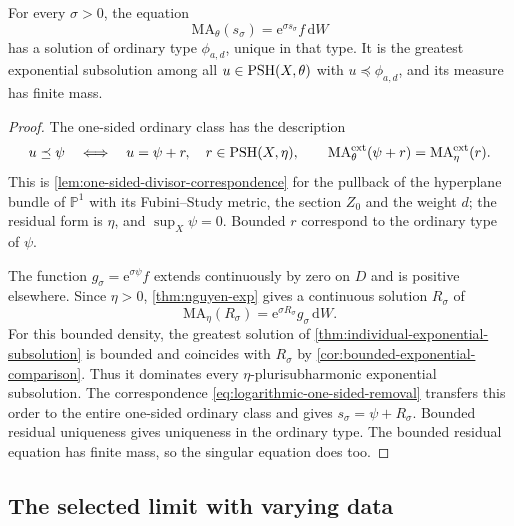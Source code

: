 \begin{lemma}\label{lem:logarithmic-greatest-solutions}
For every $\sigma>0$, the equation
\begin{equation}\label{eq:logarithmic-product-exponential}
 \mathrm{MA}_\theta(s_\sigma)=\mathrm{e}^{\sigma s_\sigma}f\,\mathrm{d}W
\end{equation}
has a solution of ordinary type $\phi_{a,d}$, unique in that type. It is the greatest exponential subsolution among all $u\in\mathrm{PSH}(X,\theta)$ with $u\preceq\phi_{a,d}$, and its measure has finite mass.
\end{lemma}
\begin{proof}
The one-sided ordinary class has the description
\begin{equation}\label{eq:logarithmic-one-sided-removal}
 u\preceq\psi\quad\Longleftrightarrow\quad
 u=\psi+r,\quad r\in\mathrm{PSH}(X,\eta),\qquad
 \mathrm{MA}^{\mathrm{ext}}_\theta(\psi+r)
       =\mathrm{MA}^{\mathrm{ext}}_\eta(r).
\end{equation}
This is \cref{lem:one-sided-divisor-correspondence} for the pullback of the hyperplane bundle of $\mathbb P^1$ with its Fubini--Study metric, the section $Z_0$ and the weight $d$; the residual form is $\eta$, and $\sup_X\psi=0$. Bounded $r$ correspond to the ordinary type of $\psi$.

The function $g_\sigma=\mathrm{e}^{\sigma\psi}f$ extends continuously by zero on $D$ and is positive elsewhere. Since $\eta>0$, \cref{thm:nguyen-exp} gives a continuous solution $R_\sigma$ of
\[
 \mathrm{MA}_\eta(R_\sigma)=\mathrm{e}^{\sigma R_\sigma}g_\sigma\,\mathrm{d}W.
\]
For this bounded density, the greatest solution of \cref{thm:individual-exponential-subsolution} is bounded and coincides with $R_\sigma$ by \cref{cor:bounded-exponential-comparison}. Thus it dominates every $\eta$-plurisubharmonic exponential subsolution. The correspondence \eqref{eq:logarithmic-one-sided-removal} transfers this order to the entire one-sided ordinary class and gives $s_\sigma=\psi+R_\sigma$. Bounded residual uniqueness gives uniqueness in the ordinary type. The bounded residual equation has finite mass, so the singular equation does too.
\end{proof}

\subsection{The selected limit with varying data}

